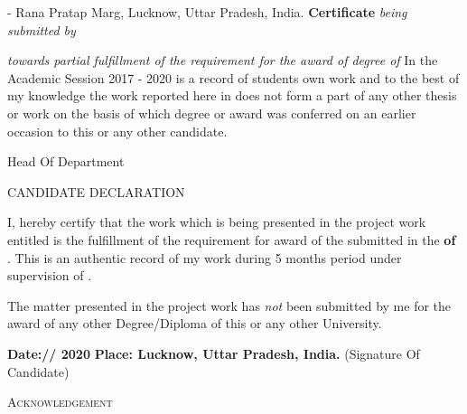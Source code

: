 	\pagebreak
	\begin{center}
		\logo
		\vs[1.5]
		{\scshape\LARGE \college}
		 - Rana Pratap Marg, Lucknow, Uttar Pradesh, India.
		\vs[1]	
		\textbf{\LARGE Certificate}
		\vs
		{\scshape\Huge \projectname}
		\vs
		{\em \large being submitted by}
		\vs
		\textbf{\large \me \linebreak \id}
		\par
		\vspace{0.6cm}
		{\large\em towards partial fulfillment of the requirement  \linebreak for the award of degree of}			
		\vs
		\textbf{\Large \degree}
		\vs
		{\large In the Academic Session 2017 - 2020}
		\vs
		is a record of students own work
		\linebreak
		and to the best of my knowledge the work reported here in does not form a part of
		\linebreak
		any other thesis or work on the basis of which degree or award was conferred on
		\linebreak
		an earlier occasion to this or any other candidate.

	\end{center}
	\vfill
	\begin{flushright}
		{\scshape\large \hod}
		\linebreak
		Head Of Department	
	\end{flushright}
	\pagebreak
	
	{\centering \scshape\LARGE CANDIDATE DECLARATION \par}
	\vs[1]
	I, hereby certify that the work which is being presented in the project work entitled \textbf{\em \projectname}
	is the fulfillment of the requirement for award of the \textbf{\degree}
	submitted in the \textbf{ \dept\space of \college}. 
	\vs[1]
	This is an authentic record of my work during 5 months period under supervision of \textbf{\sir}. 

	\vs[1]
	The matter presented in the project work has {\em not} been submitted by me for the award of any other
	Degree/Diploma of this or any other University.

	\vs[2]
	\textbf{Date:\space\space\space/\space\space\space/ 2020}		
	\vs
	\textbf{Place: Lucknow, Uttar Pradesh, India.}
	\hfill
	(Signature Of Candidate)
	\pagebreak
	
	{\centering\scshape\LARGE Acknowledgement \par}
	\vs[1]
		
